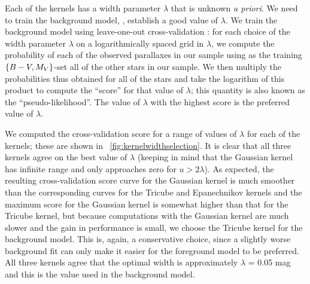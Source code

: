Each of the kernels has a width parameter $\lambda$ that is unknown
\emph{a priori}. We need to train the background model, \ie, establish
a good value of $\lambda$. We train the background model using
leave-one-out cross-validation \citep{stone74a}: for each choice of
the width parameter $\lambda$ on a logarithmically spaced grid in
$\lambda$, we compute the probability of each of the observed
parallaxes in our sample using as the training $\{B-V,M_V\}$-set
all of the other stars in our sample. We then multiply the
probabilities thus obtained for all of the stars and take the
logarithm of this product to compute the ``score'' for that value of
$\lambda$; this quantity is also known as the
``pseudo-likelihood''. The value of $\lambda$ with the highest score
is the preferred value of $\lambda$.

We computed the cross-validation score for a range of values of
$\lambda$ for each of the kernels; these are shown in
\figurename~\ref{fig:kernelwidthselection}. It is clear that all three
kernels agree on the best value of $\lambda$ (keeping in mind that the
Gaussian kernel has infinite range and only approaches zero for $u >
2\lambda$). As expected, the resulting cross-validation score curve
for the Gaussian kernel is much smoother than the corresponding curves
for the Tricube and Epanechnikov kernels and the maximum score for the
Gaussian kernel is somewhat higher than that for the Tricube kernel,
but because computations with the Gaussian kernel are much slower and
the gain in performance is small, we choose the Tricube kernel for the
background model. This is, again, a conservative choice, since a
slightly worse background fit can only make it easier for the
foreground model to be preferred. All three kernels agree that the
optimal width is approximately $\lambda$ = 0.05 mag and this is the
value used in the background model.

